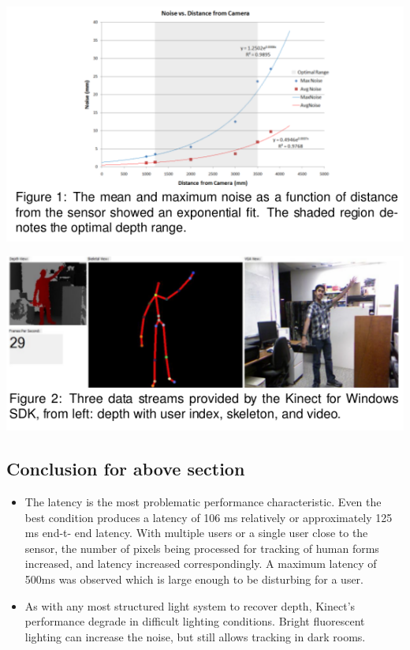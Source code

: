 \documentclass[a4paper,10pt]{report}
\begin{document}
\newline
\newline
\includegraphics[scale=0.4]{./1.png}

\newline
\newline
\includegraphics[scale=0.4]{./2.png}
\newline
\newline


\subsection{Conclusion for above section}
\begin{itemize}
 \item The \strong latency is the most problematic performance characteristic. Even the best condition produces a latency of 106 ms relatively or approximately 125 ms end-t- end latency. With multiple users or a single user close to the sensor, the number of pixels being processed for tracking of human forms increased, and latency increased correspondingly. A maximum latency of 500ms was observed which is large enough to be disturbing for a user.
 \item As with any most structured light system to recover depth, Kinect's performance degrade in difficult lighting conditions. Bright fluorescent lighting can increase the noise, but still allows tracking in dark rooms. 
\end{itemize}
\end{document}
